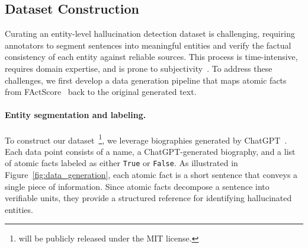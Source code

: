 \subsection{Dataset Construction}

Curating an entity-level hallucination detection dataset is challenging, requiring annotators to segment sentences into meaningful entities and verify the factual consistency of each entity against reliable sources. This process is time-intensive, requires domain expertise, and is prone to subjectivity~\citep{cao-wang-2021-cliff}. To address these challenges, we first develop a data generation pipeline that maps atomic facts from {FActScore}~\citep{min-etal-2023-factscore} back to the original generated text. 


\paragraph{Entity segmentation and labeling.} To construct our dataset~\dataset\footnote{\dataset will be publicly released under the MIT license.}, we leverage biographies generated by ChatGPT~\citep{openai2025chatgpt}. Each data point consists of a name, a ChatGPT-generated biography, and a list of atomic facts labeled as either \texttt{True} or \texttt{False}. As illustrated in Figure~\ref{fig:data_generation}, each atomic fact is a short sentence that conveys a single piece of information. Since atomic facts decompose a sentence into verifiable units, they provide a structured reference for identifying hallucinated entities. 

